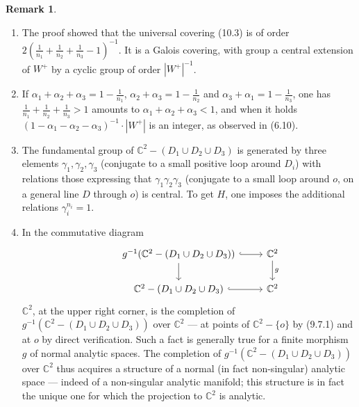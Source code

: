 \documentclass[12pt,a4paper]{article}
\theoremstyle{plain}
\theoremstyle{definition}
\newtheorem{remark}[theorem]{Remark}
\theoremstyle{remark}
\begin{document}
\begin{remark}
\label{10.4}
\quad
\begin{enumerate}
\item[(i)] The proof showed that the universal covering (10.3) is of order $2 \left( \frac{1}{n_1} + \frac{1}{n_2} + \frac{1}{n_3} - 1 \right)^{-1}$. It is a Galois covering, with group a central extension of $W^+$ by a cyclic group of order $|W^+|^{-1}$.
\item[(ii)] If $\alpha_1 + \alpha_2 + \alpha_3 = 1 - \frac{1}{n_1}$, $\alpha_2 + \alpha_3 = 1 - \frac{1}{n_2}$ and $\alpha_3 + \alpha_1 = 1 - \frac{1}{n_3}$, one has $\frac{1}{n_1} + \frac{1}{n_2} + \frac{1}{n_3} > 1$ amounts to $\alpha_1 + \alpha_2 + \alpha_3 < 1$, and when it holds $(1 - \alpha_1 - \alpha_2 - \alpha_3)^{-1} \cdot |W^+|$ is an integer, as observed in (6.10).
\item[(iii)] The fundamental group of $\mathbb{C}^2 - (D_1 \cup D_2 \cup D_3)$ is generated by three elements $\gamma_1, \gamma_2, \gamma_3$ (conjugate to a small positive loop around $D_i$) with relations those expressing that $\gamma_1 \gamma_2 \gamma_3$ (conjugate to a small loop around $o$, on a general line $D$ through $o$) is central. To get $H$, one imposes the additional relations $\gamma_i^{n_i} = 1$.
\item[(iv)] In the commutative diagram
\[
\begin{tikzcd}
& g^{-1}(\mathbb{C}^2 - (D_1 \cup D_2 \cup D_3)) \arrow[r, hook] \arrow[d] & \mathbb{C}^2 \arrow[d, "g"] \\
& \mathbb{C}^2 - (D_1 \cup D_2 \cup D_3) \arrow[r, hook] & \mathbb{C}^2
\end{tikzcd}
\]
$\mathbb{C}^2$, at the upper right corner, is the completion of $g^{-1}(\mathbb{C}^2 - (D_1 \cup D_2 \cup D_3))$ over $\mathbb{C}^2$ --- at points of $\mathbb{C}^2 - \{o\}$ by (9.7.1) and at $o$ by direct verification. Such a fact is generally true for a finite morphism $g$ of normal analytic spaces. The completion of $g^{-1}(\mathbb{C}^2 - (D_1 \cup D_2 \cup D_3))$ over $\mathbb{C}^2$ thus acquires a structure of a normal (in fact non-singular) analytic space --- indeed of a non-singular analytic manifold; this structure is in fact the unique one for which the projection to $\mathbb{C}^2$ is analytic.
\end{enumerate}
\end{remark}
\end{document}
